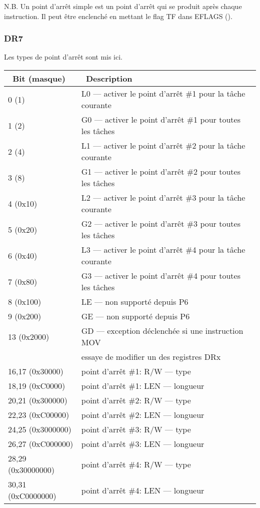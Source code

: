 N.B.  Un point d'arrêt simple est un point d'arrêt qui se produit après chaque instruction.
Il peut être enclenché en mettant le flag TF dans EFLAGS ().

\subsubsection{DR7}

Les types de point d'arrêt sont mis ici.

\small
\begin{center}
\begin{tabular}{ | l | l | }
\hline
\headercolor\ Bit (masque) &
\headercolor\ Description \\
\hline
0 (1)       &  L0 --- activer le point d'arrêt \#1 pour la tâche courante \\
\hline
1 (2)       &  G0 --- activer le point d'arrêt \#1 pour toutes les tâches \\
\hline
2 (4)       &  L1 --- activer le point d'arrêt \#2 pour la tâche courante \\
\hline
3 (8)       &  G1 --- activer le point d'arrêt \#2 pour toutes les tâches \\
\hline
4 (0x10)    &  L2 --- activer le point d'arrêt \#3 pour la tâche courante \\
\hline
5 (0x20)    &  G2 --- activer le point d'arrêt \#3 pour toutes les tâches \\
\hline
6 (0x40)    &  L3 --- activer le point d'arrêt \#4 pour la tâche courante \\
\hline
7 (0x80)    &  G3 --- activer le point d'arrêt \#4 pour toutes les tâches \\
\hline
8 (0x100)   &  LE --- non supporté depuis P6 \\
\hline
9 (0x200)   &  GE --- non supporté depuis P6 \\
\hline
13 (0x2000) &  GD --- exception déclenchée si une instruction MOV \\
            &  essaye de modifier un des registres DRx \\
\hline
16,17 (0x30000)    &  point d'arrêt \#1: R/W --- type \\
\hline
18,19 (0xC0000)    &  point d'arrêt \#1: LEN --- longueur \\
\hline
20,21 (0x300000)   &  point d'arrêt \#2: R/W --- type \\
\hline
22,23 (0xC00000)   &  point d'arrêt \#2: LEN --- longueur \\
\hline
24,25 (0x3000000)  &  point d'arrêt \#3: R/W --- type \\
\hline
26,27 (0xC000000)  &  point d'arrêt \#3: LEN --- longueur \\
\hline
28,29 (0x30000000) &  point d'arrêt \#4: R/W --- type \\
\hline
30,31 (0xC0000000) &  point d'arrêt \#4: LEN --- longueur \\
\hline
\end{tabular}
\end{center}
\normalsize

